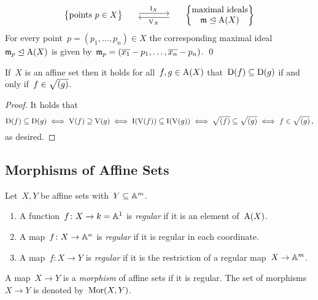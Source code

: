 \begin{theorem}
\[\begin{matrix}
        {}
      & {}
      & {}
      \\
        \left\{
          \begin{tabular}{@{}c@{}}
            points~$p \in X$
          \end{tabular}
        \right\}
      & \begin{tikzcd}[column sep = large]
            {}
            \arrow[shift left]{r}{\videal_X}
          & {}
            \arrow[shift left]{l}{\vset_X}
        \end{tikzcd}
      & \left\{
          \begin{tabular}{@{}c@{}}
            maximal ideals \\
            $\mf{m} \idealleq \coord(X)$
          \end{tabular}
        \right\}
    \end{matrix}
  \]
  For every point~$p = (p_1, \dotsc, p_n) \in X$ the corresponding maximal ideal~$\mathfrak{m}_p \trianglelefteq \operatorname{A}(X)$ is given by~$\mathfrak{m}_p = (\overline{x_1} - p_1, \dotsc, \overline{x_n} - p_n)$.
  \qed
\end{theorem}


\begin{corollary}
  \label{containment of D}
  If~$X$ is an affine set then it holds for all~$f, g \in \operatorname{A}(X)$ that~$\operatorname{D}(f) \subseteq \operatorname{D}(g)$ if and only if~$f \in \sqrt{(g)}$.
\end{corollary}


\begin{proof}
  It holds that
  \[
          \operatorname{D}(f) \subseteq \operatorname{D}(g)
    \iff  \operatorname{V}(f) \supseteq \operatorname{V}(g)
    \iff  \operatorname{I}(\operatorname{V}(f)) \subseteq \operatorname{I}(\operatorname{V}(g))
    \iff  \sqrt{(f)} \subseteq \sqrt{(g)}
    \iff  f \in \sqrt{(g)} \,,
  \]
  as desired.
\end{proof}





\subsection{Morphisms of Affine Sets}


\begin{definition}
  \label{regular for affine}
  Let~$X,Y$ be affine sets with~$Y \subseteq \mathbb{A}^m$.
  \begin{enumerate}
    \item
      A function~$f \colon X \to k = \mathbb{A}^1$ is \emph{regular} if it is an element of~$\operatorname{A}(X)$.
    \item
      A map~$f \colon X \to \mathbb{A}^n$ is \emph{regular} if it is regular in each coordinate.
    \item
      A map~$f \colon X \to Y$ is \emph{regular} if it is the restriction of a regular map~$X \to \mathbb{A}^m$.
  \end{enumerate}
  A map~$X \to Y$ is a \emph{morphism} of affine sets if it is regular.
  The set of morphisms~$X \to Y$ is denoted by~$\operatorname{Mor}(X,Y)$.
\end{definition}


